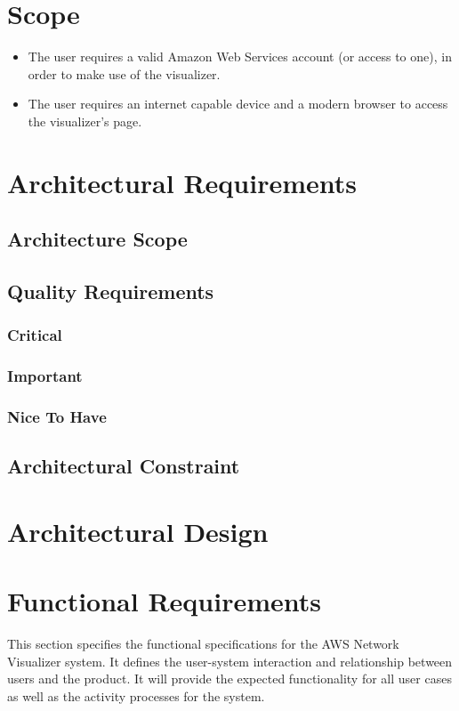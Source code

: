 \documentclass[hidelinks,a4paper,12pt]{article}
\begin{document}
\section{Scope}
\begin {itemize}
	\item The user requires a valid Amazon Web Services account (or access to one), in order to make use of the visualizer.
	\item The user requires an internet capable device and a modern browser to access the visualizer's page.
\end{itemize}
\newpage

\section{Architectural Requirements}
	\subsection{Architecture Scope}
	\subsection{Quality Requirements}
		\subsubsection {Critical}
		\subsubsection {Important}
		\subsubsection {Nice To Have}
	\subsection{Architectural Constraint}
	
\section{Architectural Design}

\newpage
\section{Functional Requirements}
	This section specifies the functional specifications for the AWS Network Visualizer system. It defines the user-system interaction and relationship between users and the product. It will provide the expected functionality for all user cases as well as the activity processes for the system.
	
\end{document}
